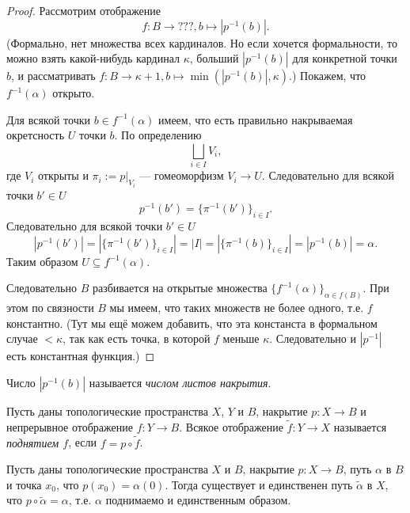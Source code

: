\documentclass[12pt,a4paper]{article}
\begin{document}
    \begin{proof}
        Рассмотрим отображение
        \[f: B \to ???, b \mapsto |p^{-1}(b)|.\]
        (Формально, нет множества всех кардиналов. Но если хочется формальности, то можно взять какой-нибудь кардинал $\kappa$, больший $|p^{-1}(b)|$ для конкретной точки $b$, и рассматривать $f: B \to \kappa+1, b \mapsto \min(|p^{-1}(b)|, \kappa)$.) Покажем, что $f^{-1}(\alpha)$ открыто.

        Для всякой точки $b \in f^{-1}(\alpha)$ имеем, что есть правильно накрываемая окретсность $U$ точки $b$. По определению
        \[\bigsqcup_{i \in I} V_i,\]
        где $V_i$ открыты и $\pi_i := p|_{V_i}$ --- гомеоморфизм $V_i \to U$. Следовательно для всякой точки $b' \in U$
        \[p^{-1}(b') = \{\pi^{-1}(b')\}_{i \in I}.\]
        Следовательно для всякой точки $b' \in U$
        \[|p^{-1}(b')| = |\{\pi^{-1}(b')\}_{i \in I}| = |I| = |\{\pi^{-1}(b)\}_{i \in I}| = |p^{-1}(b)| = \alpha.\]
        Таким образом $U \subseteq f^{-1}(\alpha)$.

        Следовательно $B$ разбивается на открытые множества $\{f^{-1}(\alpha)\}_{\alpha \in f(B)}$. При этом по связности $B$ мы имеем, что таких множеств не более одного, т.е. $f$ константно. (Тут мы ещё можем добавить, что эта констанста в формальном случае $< \kappa$, так как есть точка, в которой $f$ меньше $\kappa$. Следовательно и $|p^{-1}|$ есть константная функция.)
    \end{proof}

    \begin{definition}
        Число $|p^{-1}(b)|$ называется \emph{числом листов накрытия}.
    \end{definition}

    \begin{definition}
        Пусть даны топологические пространства $X$, $Y$ и $B$, накрытие $p: X \to B$ и непрерывное отображение $f: Y \to B$. Всякое отображение $\tilde{f}: Y \to X$ называется \emph{поднятием $f$}, если $f = p \circ \tilde{f}$.
    \end{definition}

    \begin{theorem}
        Пусть даны топологические пространства $X$ и $B$, накрытие $p: X \to B$, путь $\alpha$ в $B$ и точка $x_0$, что $p(x_0) = \alpha(0)$. Тогда существует и единственен путь $\tilde{\alpha}$ в $X$, что $p \circ \tilde{\alpha} = \alpha$, т.е. $\alpha$ поднимаемо и единственным образом.
    \end{theorem}
\end{document}

